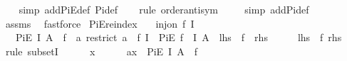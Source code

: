 \begin{isabellebody}
%
\isadelimproof
\ \ %
\endisadelimproof
%
\isatagproof
{}\isamarkupfalse%
\ {\isacharparenleft}{\kern0pt}simp\ add{\isacharcolon}{\kern0pt}PiE{\isacharunderscore}{\kern0pt}def\ Pi{\isacharunderscore}{\kern0pt}def{\isacharparenright}{\kern0pt}\isanewline
\ \ \isamarkupfalse%
\ {\isacharparenleft}{\kern0pt}rule\ order{\isacharunderscore}{\kern0pt}antisym{\isacharparenright}{\kern0pt}\isanewline
\ \ \ \isamarkupfalse%
\ {\isacharparenleft}{\kern0pt}simp\ add{\isacharcolon}{\kern0pt}Pi{\isacharunderscore}{\kern0pt}def{\isacharparenright}{\kern0pt}\isanewline
\ \ \isamarkupfalse%
\ assms\ \isamarkupfalse%
\ fastforce%
\endisatagproof
{\isafoldproof}%
%
\isadelimproof
\isanewline
%
\endisadelimproof
\isanewline
{}\isamarkupfalse%
\ PiE{\isacharunderscore}{\kern0pt}reindex{\isacharcolon}{\kern0pt}\isanewline
\ \ \ {\isachardoublequoteopen}inj{\isacharunderscore}{\kern0pt}on\ f\ I{\isachardoublequoteclose}\isanewline
\ \ \ {\isachardoublequoteopen}PiE\ I\ {\isacharparenleft}{\kern0pt}A\ {\isasymcirc}\ f{\isacharparenright}{\kern0pt}\ {\isacharequal}{\kern0pt}\ {\isacharparenleft}{\kern0pt}{\isasymlambda}a{\isachardot}{\kern0pt}\ restrict\ {\isacharparenleft}{\kern0pt}a\ {\isasymcirc}\ f{\isacharparenright}{\kern0pt}\ I{\isacharparenright}{\kern0pt}\ {\isacharbackquote}{\kern0pt}\ PiE\ {\isacharparenleft}{\kern0pt}f\ {\isacharbackquote}{\kern0pt}\ I{\isacharparenright}{\kern0pt}\ A{\isachardoublequoteclose}\ {\isacharparenleft}{\kern0pt}\ {\isachardoublequoteopen}{\isacharquery}{\kern0pt}lhs\ {\isacharequal}{\kern0pt}\ {\isacharquery}{\kern0pt}f\ {\isacharbackquote}{\kern0pt}\ {\isacharquery}{\kern0pt}rhs{\isachardoublequoteclose}{\isacharparenright}{\kern0pt}\isanewline
%
\isadelimproof
%
\endisadelimproof
%
\isatagproof
{}\isamarkupfalse%
\ {\isacharminus}{\kern0pt}\isanewline
\ \ \isamarkupfalse%
\ {\isachardoublequoteopen}{\isacharquery}{\kern0pt}lhs\ {\isasymsubseteq}\ {\isacharquery}{\kern0pt}f{\isacharbackquote}{\kern0pt}\ {\isacharquery}{\kern0pt}rhs{\isachardoublequoteclose}\isanewline
\ \ \isamarkupfalse%
\ {\isacharparenleft}{\kern0pt}rule\ subsetI{\isacharparenright}{\kern0pt}\isanewline
\ \ \ \ \isamarkupfalse%
\ x\isanewline
\ \ \ \ \isamarkupfalse%
\ a{\isacharcolon}{\kern0pt}{\isachardoublequoteopen}x\ {\isasymin}\ Pi\isactrlsub E\ I\ {\isacharparenleft}{\kern0pt}A\ {\isasymcirc}\ f{\isacharparenright}{\kern0pt}{\isachardoublequoteclose}\isanewline

\end{isabellebody}
